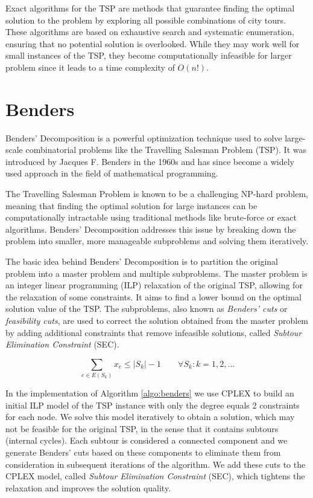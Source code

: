 Exact algorithms for the TSP are methods that guarantee finding the optimal solution to the problem by exploring all possible combinations of city tours. These algorithms are based on exhaustive search and systematic enumeration, ensuring that no potential solution is overlooked. While they may work well for small instances of the TSP, they become computationally infeasible for larger problem since it leads to a time complexity of $O(n!)$.


\section{Benders}
Benders' Decomposition is a powerful optimization technique used to solve large-scale combinatorial problems like the Travelling Salesman Problem (TSP). It was introduced by Jacques F. Benders in the 1960s \cite{benders1962} and has since become a widely used approach in the field of mathematical programming.

The Travelling Salesman Problem is known to be a challenging NP-hard problem, meaning that finding the optimal solution for large instances can be computationally intractable using traditional methods like brute-force or exact algorithms. Benders' Decomposition addresses this issue by breaking down the problem into smaller, more manageable subproblems and solving them iteratively.

The basic idea behind Benders' Decomposition is to partition the original problem into a master problem and multiple subproblems. The master problem is an integer linear programming (ILP) relaxation of the original TSP, allowing for the relaxation of some constraints. It aims to find a lower bound on the optimal solution value of the TSP. The subproblems, also known as \textit{Benders' cuts} or \textit{feasibility cuts}, are used to correct the solution obtained from the master problem by adding additional constraints that remove infeasible solutions, called \textit{Subtour Elimination Constraint} (SEC).

\begin{equation*}
    \sum_{e \in E(S_k)} x_e \leq |S_k|-1 \quad \quad \forall S_k: k=1,2,...
\end{equation*}

In the implementation of Algorithm \ref{algo:benders} we use CPLEX to build an initial ILP model of the TSP instance with only the degree equals 2 constraints for each node. We solve this model iteratively to obtain a solution,  which may not be feasible for the original TSP, in the sense that it contains subtours (internal cycles). Each subtour is considered a connected component and we generate Benders' cuts based on these components to eliminate them from consideration in subsequent iterations of the algorithm. We add these cuts to the CPLEX model, called \textit{Subtour Elimination Constraint} (SEC), which tightens the relaxation and improves the solution quality.



